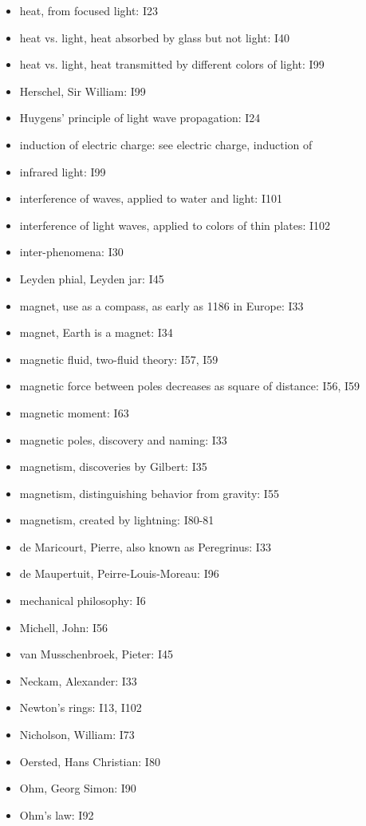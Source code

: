 \documentclass[a4paper]{article}
\theoremstyle{plain}
\theoremstyle{definition}
\begin{document}
\begin{itemize}
\item heat, from focused light: I23
\item heat vs. light, heat absorbed by glass but not light: I40
\item heat vs. light, heat transmitted by different colors of light: I99
\item Herschel, Sir William: I99
\item Huygens' principle of light wave propagation: I24
\item induction of electric charge: see electric charge, induction of
\item infrared light: I99
\item interference of waves, applied to water and light: I101
\item interference of light waves, applied to colors of thin plates: I102
\item inter-phenomena: I30
\item Leyden phial, Leyden jar: I45
\item magnet, use as a compass, as early as 1186 in Europe: I33
\item magnet, Earth is a magnet: I34
\item magnetic fluid, two-fluid theory: I57, I59
\item magnetic force between poles decreases as square of distance: I56, I59
\item magnetic moment: I63
\item magnetic poles, discovery and naming: I33
\item magnetism, discoveries by Gilbert: I35
\item magnetism, distinguishing behavior from gravity: I55
\item magnetism, created by lightning: I80-81
\item de Maricourt, Pierre, also known as Peregrinus: I33
\item de Maupertuit, Peirre-Louis-Moreau: I96
\item mechanical philosophy: I6
\item Michell, John: I56
\item van Musschenbroek, Pieter: I45
\item Neckam, Alexander: I33
\item Newton's rings: I13, I102
\item Nicholson, William: I73
\item Oersted, Hans Christian: I80
\item Ohm, Georg Simon: I90
\item Ohm's law: I92

\end{itemize}
\end{document}
